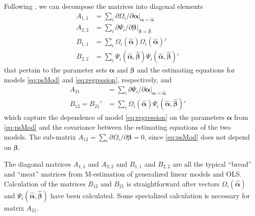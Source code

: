 \documentclass[]{article}
\begin{document}
Following \citet[][p. 373]{carroll2006measurement}, we %
can decompose the matrices into diagonal elements
\begin{equation*}
    \begin{split}
        A_{1,1}&=\sum_i \partial \Omega_i/\partial \bm{\alpha}|_{\bm{\alpha}=\bm{\hat{\alpha}}}\\
        A_{2,2}&=\sum_i\partial\Psi_i/\partial \bm{\beta}|_{\bm{\beta}=\bm{\hat{\beta}}}\\
        B_{1,1}&=\sum_i\Omega_i(\bm{\hat\alpha})\Omega_i(\bm{\hat\alpha})'\\
        B_{2,2}&=\sum_i \Psi_i(\bm{\hat\alpha},\bm{\hat\beta})\Psi_i(\bm{\hat\alpha},\bm{\hat\beta})'
    \end{split}
\end{equation*}
 that pertain to the parameter sets $\bm{\alpha}$ and $\bm{\beta}$ and the estimating equations for models \eqref{eq:psMod} and  \eqref{eq:regression}, respectively, and
 \begin{equation*}
     \begin{split}
         A_{21}&=\sum_i\partial\Psi_i/\partial \bm{\alpha}|_{\bm{\alpha}=\bm{\hat{\alpha}}}\\
         B_{12}=B_{21}'&=\sum_i \Omega_i(\bm{\hat{\alpha}})\Psi_i(\bm{\hat{\alpha}},\bm{\hat{\beta}})'
     \end{split}
 \end{equation*}
 which capture the dependence of model \eqref{eq:regression} on the parameters $\bm{\alpha}$ from \eqref{eq:psMod} and the covariance between the estimating equations of the two models.
The sub-matrix $A_{12}=\sum_i \partial \Omega_i/\partial \bm{\beta}=0$, since \eqref{eq:psMod} does not depend on $\bm{\beta}$.

The diagonal matrices $A_{1,1}$ and $A_{2,2}$ and $B_{1,1}$ and $B_{2,2}$ are all the typical ``bread'' and ``meat'' matrices from M-estimation of generalized linear models and OLS.
Calculation of the matrices $B_{12}$ and $B_{21}$ is straightforward after vectors $\Omega_i(\bm{\hat{\alpha}})$ and $\Psi_i(\bm{\hat{\alpha}},\bm{\hat{\beta}})$ have been calculated.
Some specialized calculation is necessary for matrix $A_{21}$.
\end{document}
